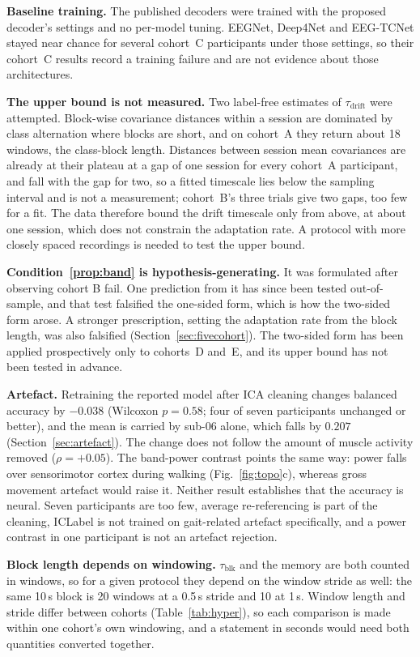 \documentclass[a4paper,fleqn]{cas-dc}
\begin{document}
\textbf{Baseline training.} The published decoders were trained with the proposed
decoder's settings and no per-model tuning. EEGNet, Deep4Net and EEG-TCNet stayed near chance for several cohort~C participants under those settings, so their cohort~C
results record a training failure and are not evidence about those
architectures.

\textbf{The upper bound is not measured.} Two label-free estimates of
$\tau_{\mathrm{drift}}$ were attempted. Block-wise covariance distances within a
session are dominated by class alternation where blocks are short, and on
cohort~A they return about 18 windows, the class-block length. Distances between
session mean covariances are already at their plateau at a gap of one session
for every cohort~A participant, and fall with the gap for two, so a fitted
timescale lies below the sampling interval and is not a measurement; cohort~B's
three trials give two gaps, too few for a fit. The data therefore bound the
drift timescale only from above, at about one session, which does not constrain
the adaptation rate. A protocol with more closely spaced recordings is needed to
test the upper bound.

\textbf{Condition~\ref{prop:band} is hypothesis-generating.} It was formulated after observing cohort B fail. One prediction from it has since been tested out-of-sample, and that test falsified the one-sided form, which is how the two-sided form arose. A stronger prescription, setting the adaptation rate from the block length, was also falsified (Section~\ref{sec:fivecohort}). The two-sided form has been applied prospectively only to cohorts~D and~E, and its upper bound has not been tested in advance.

\textbf{Artefact.} Retraining the reported model after ICA cleaning changes balanced accuracy by $-0.038$ (Wilcoxon $p=0.58$; four of seven participants unchanged or better), and the mean is carried by sub-06 alone, which falls by $0.207$ (Section~\ref{sec:artefact}). The change does not follow the amount of muscle activity removed ($\rho=+0.05$). The band-power contrast points the same way: power falls over sensorimotor cortex during walking (Fig.~\ref{fig:topo}c), whereas gross movement artefact would raise it. Neither result establishes that the accuracy is neural. Seven participants are too few, average re-referencing is part of the cleaning, ICLabel is not trained on gait-related artefact specifically, and a power contrast in one participant is not an artefact rejection.

\textbf{Block length depends on windowing.} $\tau_{\mathrm{blk}}$ and the
memory are both counted in windows, so for a given protocol they depend on the
window stride as well: the same 10\,s block is 20 windows at a 0.5\,s stride and
10 at 1\,s. Window length and stride differ between cohorts
(Table~\ref{tab:hyper}), so each comparison is made within one cohort's own
windowing, and a statement in seconds would need both quantities converted
together.
\end{document}
